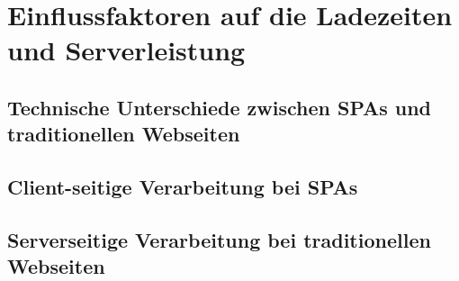 \section{Einflussfaktoren auf die Ladezeiten und Serverleistung}
\subsection{Technische Unterschiede zwischen SPAs und traditionellen Webseiten}
\subsection{Client-seitige Verarbeitung bei SPAs}
\subsection{Serverseitige Verarbeitung bei traditionellen Webseiten}
